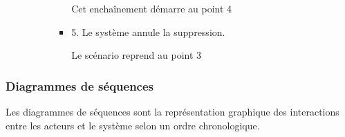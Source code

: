 \begin{itemize}
\begin{itemize}
\begin{itemize}
\begin{itemize}
				                        Cet enchaînement démarre au point 4

				                  \item 5. Le système annule la suppression.

				                        Le scénario reprend au point 3
			                  \end{itemize}
		            \end{itemize}
	      \end{itemize}
\end{itemize}

\newpage
\subsubsection{Diagrammes de séquences}

Les diagrammes de séquences sont la représentation graphique des interactions entre les acteurs et le système selon un ordre chronologique.

